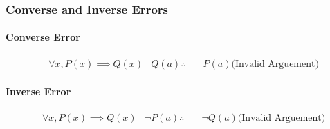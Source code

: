 \subsubsection*{Converse and Inverse Errors}
\paragraph*{Converse Error}
\begin{align*}
    &\forall x, P(x) \implies Q(x)
    &Q(a)
    \therefore \quad &P(a) \text{(Invalid Arguement)}
\end{align*}

\paragraph*{Inverse Error}
\begin{align*}
    &\forall x, P(x) \implies Q(x)
    &\neg P(a)
    \therefore \quad &\neg Q(a) \text{(Invalid Arguement)}
\end{align*}